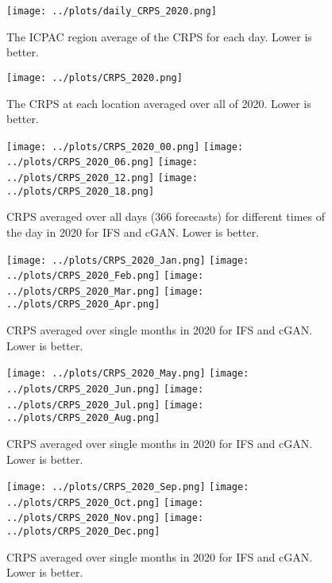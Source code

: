 \documentclass[12pt]{article}
\begin{document}
\begin{figure}
\begin{center}
\texttt{[image: ../plots/daily\_CRPS\_2020.png]}
\end{center}
\caption{The ICPAC region average of the CRPS for each day. Lower is better.}
\end{figure}

\begin{figure}
\begin{center}
\texttt{[image: ../plots/CRPS\_2020.png]}
\end{center}
\caption{The CRPS at each location averaged over all of 2020. Lower is better.}
\end{figure}

\begin{figure}
\begin{center}
\texttt{[image: ../plots/CRPS\_2020\_00.png]}
\texttt{[image: ../plots/CRPS\_2020\_06.png]}
\texttt{[image: ../plots/CRPS\_2020\_12.png]}
\texttt{[image: ../plots/CRPS\_2020\_18.png]}
\end{center}
\caption{CRPS averaged over all days (366 forecasts) for different times of the day in 2020 for IFS and cGAN. Lower is better.}
\end{figure}

\begin{figure}
\begin{center}
\texttt{[image: ../plots/CRPS\_2020\_Jan.png]}
\texttt{[image: ../plots/CRPS\_2020\_Feb.png]}
\texttt{[image: ../plots/CRPS\_2020\_Mar.png]}
\texttt{[image: ../plots/CRPS\_2020\_Apr.png]}
\end{center}
\caption{CRPS averaged over single months in 2020 for IFS and cGAN. Lower is better.}
\end{figure}

\begin{figure}
\begin{center}
\texttt{[image: ../plots/CRPS\_2020\_May.png]}
\texttt{[image: ../plots/CRPS\_2020\_Jun.png]}
\texttt{[image: ../plots/CRPS\_2020\_Jul.png]}
\texttt{[image: ../plots/CRPS\_2020\_Aug.png]}
\end{center}
\caption{CRPS averaged over single months in 2020 for IFS and cGAN. Lower is better.}
\end{figure}

\begin{figure}
\begin{center}
\texttt{[image: ../plots/CRPS\_2020\_Sep.png]}
\texttt{[image: ../plots/CRPS\_2020\_Oct.png]}
\texttt{[image: ../plots/CRPS\_2020\_Nov.png]}
\texttt{[image: ../plots/CRPS\_2020\_Dec.png]}
\end{center}
\caption{CRPS averaged over single months in 2020 for IFS and cGAN. Lower is better.}
\end{figure}
\end{document}

